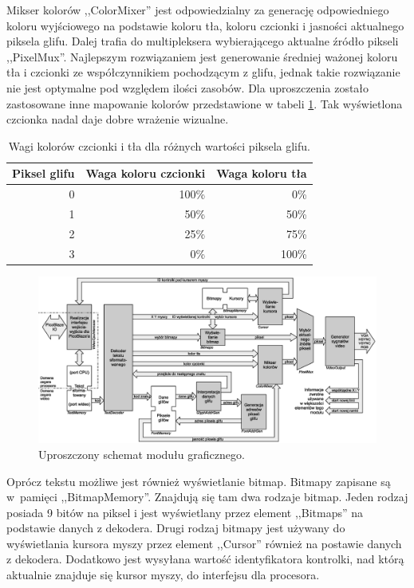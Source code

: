 Mikser kolorów ,,ColorMixer'' jest odpowiedzialny za generację odpowiedniego koloru wyjściowego na podstawie koloru tła, koloru czcionki i jasności aktualnego piksela glifu. Dalej trafia do multipleksera wybierającego aktualne źródło pikseli ,,PixelMux''. Najlepszym rozwiązaniem jest generowanie średniej ważonej koloru tła i czcionki ze współczynnikiem pochodzącym z glifu, jednak takie rozwiązanie nie jest optymalne pod względem ilości zasobów. Dla uproszczenia zostało zastosowane inne mapowanie kolorów przedstawione w tabeli \ref{tab:colorMixer}. Tak wyświetlona czcionka nadal daje dobre wrażenie wizualne.

\begin{table}[h]
	\begin{center}
		{\footnotesize
			\begin{tabular}{|r|r|r|}
				\hline \textbf{Piksel glifu} & \textbf{Waga koloru czcionki} & \textbf{Waga koloru tła} \\
				\hline 0 & 100\% & 0\% \\
				\hline 1 & 50\% & 50\% \\
				\hline 2 & 25\% & 75\% \\
				\hline 3 & 0\% & 100\% \\
				\hline 
			\end{tabular}}
			\caption{ Wagi kolorów czcionki i tła dla różnych wartości piksela glifu. }
			\label{tab:colorMixer}
		\end{center}
	\end{table}


\begin{figure}
	\centering
	\includegraphics[width=22cm]{obrazki/render_flow.eps}
	\caption{ Uproszczony schemat modułu graficznego. }
	\label{render_flow}
\end{figure}

\clearpage

Oprócz tekstu możliwe jest również wyświetlanie bitmap. Bitmapy zapisane są w~pamięci ,,BitmapMemory''. Znajdują się tam dwa rodzaje bitmap. Jeden rodzaj posiada 9 bitów na piksel i jest wyświetlany przez element ,,Bitmaps'' na podstawie danych z dekodera. Drugi rodzaj bitmapy jest używany do wyświetlania kursora myszy przez element ,,Cursor'' również na postawie danych z dekodera. Dodatkowo jest wysyłana wartość identyfikatora kontrolki, nad którą aktualnie znajduje się kursor myszy, do interfejsu dla procesora.

